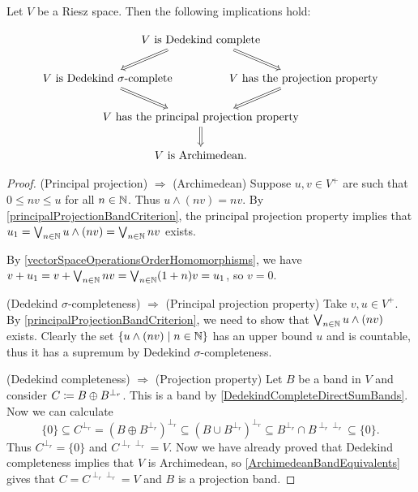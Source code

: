 \begin{proposition}
Let $V$ be a Riesz space. Then the following implications hold:

\[ \begin{tikzcd}[column sep=0]
& \text{$V$ is Dedekind complete} \ar[dl, Rightarrow, end anchor={[xshift=2em]north east}] \ar[dr, Rightarrow, end anchor={[xshift = -2em]north west}] & \\
\text{$V$ is Dedekind $\sigma$-complete} \hspace{-7em} \ar[dr, Rightarrow, start anchor={[xshift=2em]south east}] && \hspace{-7em} \text{$V$ has the projection property} \ar[dl, Rightarrow, start anchor={[xshift=-2em]south west}] \\
& \text{$V$ has the principal projection property} \ar[d, Rightarrow] & \\
& \text{$V$ is Archimedean.} &
\end{tikzcd} \]
\end{proposition}
\begin{proof}
(Principal projection) $\Rightarrow$ (Archimedean) Suppose $u,v\in V^+$ are such that $0\leq nv \leq u$ for all $n\in \mathbb{N}$. Thus $u\wedge (nv) = nv$. By \ref{principalProjectionBandCriterion}, the principal projection property implies that $u_1 = \bigvee_{n\in \mathbb{N}} u\wedge (nv) = \bigvee_{n\in \mathbb{N}}nv$ exists.

By \ref{vectorSpaceOperationsOrderHomomorphisms}, we have $v+ u_1 = v+\bigvee_{n\in \mathbb{N}}nv = \bigvee_{n\in \mathbb{N}}(1+n)v = u_1$, so $v = 0$.

(Dedekind $\sigma$-completeness) $\Rightarrow$ (Principal projection property) Take $v, u\in V^+$. By \ref{principalProjectionBandCriterion}, we need to show that $\bigvee_{n\in\mathbb{N}}u\wedge (nv)$ exists. Clearly the set $\setbuilder{u\wedge (nv)}{n\in \N}$ has an upper bound $u$ and is countable, thus it has a supremum by Dedekind $\sigma$-completeness.

(Dedekind completeness) $\Rightarrow$ (Projection property) Let $B$ be a band in $V$ and consider $C \coloneqq B \oplus B^{\perp_r}$. This is a band by \ref{DedekindCompleteDirectSumBands}. Now we can calculate
\[ \{0\} \subseteq C^{\perp_r} = (B\oplus B^{\perp_r})^{\perp_r} \subseteq (B\cup B^{\perp_r})^{\perp_r} \subseteq B^{\perp_r} \cap B^{\perp_r\perp_r} \subseteq \{0\}. \]
Thus $C^{\perp_r} = \{0\}$ and $C^{\perp_r\perp_r} = V$. Now we have already proved that Dedekind completeness implies that $V$ is Archimedean, so \ref{ArchimedeanBandEquivalents} gives that $C= C^{\perp_r\perp_r} = V$ and $B$ is a projection band.
\end{proof}

